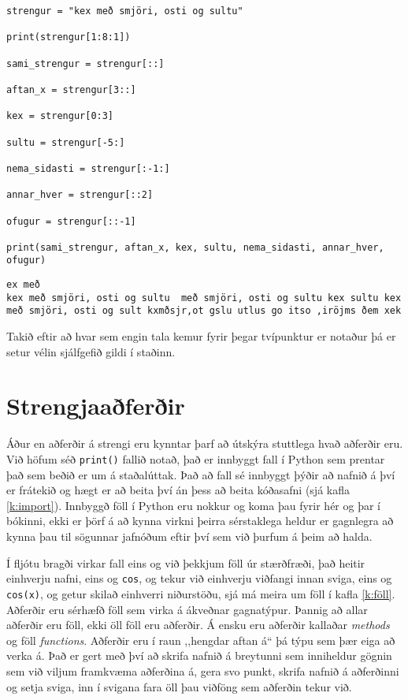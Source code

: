 \begin{lstlisting}[caption=Hlutstrengir, label=lst:hlutstrengir]
strengur = "kex með smjöri, osti og sultu"

print(strengur[1:8:1])

sami_strengur = strengur[::]

aftan_x = strengur[3::]

kex = strengur[0:3]

sultu = strengur[-5:]

nema_sidasti = strengur[:-1:]

annar_hver = strengur[::2]

ofugur = strengur[::-1]

print(sami_strengur, aftan_x, kex, sultu, nema_sidasti, annar_hver, ofugur)
\end{lstlisting}
\lstset{style=uttak}
\begin{lstlisting}
ex með 
kex með smjöri, osti og sultu  með smjöri, osti og sultu kex sultu kex með smjöri, osti og sult kxmðsjr,ot gslu utlus go itso ,iröjms ðem xek
\end{lstlisting}
\lstset{style=venjulegt}

Takið eftir að hvar sem engin tala kemur fyrir þegar tvípunktur er notaður þá er setur vélin sjálfgefið gildi í staðinn.

\section{Strengjaaðferðir}\label{uk:strengjaaðferðir}
Áður en aðferðir á strengi eru kynntar þarf að útskýra stuttlega hvað aðferðir eru.
Við höfum séð \texttt{print()} fallið notað, það er innbyggt fall í Python sem prentar það sem beðið er um á staðalúttak.
Það að fall sé innbyggt þýðir að nafnið á því er frátekið og hægt er að beita því án þess að beita kóðasafni (sjá kafla \ref{k:import}).
Innbyggð föll í Python eru nokkur og koma þau fyrir hér og þar í bókinni, ekki er þörf á að kynna virkni þeirra sérstaklega heldur er gagnlegra að kynna þau til sögunnar jafnóðum eftir því sem við þurfum á þeim að halda.

Í fljótu bragði virkar fall eins og við þekkjum föll úr stærðfræði, það heitir einhverju nafni, eins og \texttt{cos}, og tekur við einhverju viðfangi innan sviga, eins og \texttt{cos(x)}, og getur skilað einhverri niðurstöðu, sjá má meira um föll í kafla \ref{k:föll}.
Aðferðir eru sérhæfð föll sem virka á ákveðnar gagnatýpur.
Þannig að allar aðferðir eru föll, ekki öll föll eru aðferðir.
Á ensku eru aðferðir kallaðar \textit{methods} og föll \textit{functions}.
Aðferðir eru í raun ,,hengdar aftan á“ þá týpu sem þær eiga að verka á.
Það er gert með því að skrifa nafnið á breytunni sem inniheldur gögnin sem við viljum framkvæma aðferðina á, gera svo punkt, skrifa nafnið á aðferðinni og setja sviga, inn í svigana fara öll þau viðföng sem aðferðin tekur við.

